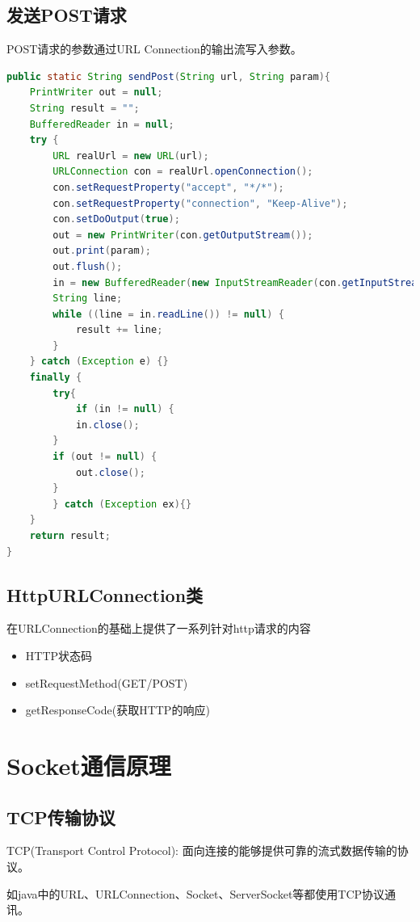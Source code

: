 \subsection{发送POST请求}
POST请求的参数通过URL Connection的输出流写入参数。
\begin{lstlisting}[language=java]
public static String sendPost(String url, String param){
	PrintWriter out = null;
	String result = "";
	BufferedReader in = null;
	try {
		URL realUrl = new URL(url);
		URLConnection con = realUrl.openConnection();
		con.setRequestProperty("accept", "*/*");
		con.setRequestProperty("connection", "Keep-Alive");
		con.setDoOutput(true);
		out = new PrintWriter(con.getOutputStream());
		out.print(param);
		out.flush();
		in = new BufferedReader(new InputStreamReader(con.getInputStream()));
		String line;
		while ((line = in.readLine()) != null) {
			result += line;
		}
	} catch (Exception e) {}
	finally {
		try{
			if (in != null) {
			in.close();
		}
		if (out != null) {
			out.close();
		}
		} catch (Exception ex){}
	}
	return result;
}
\end{lstlisting}
\subsection{HttpURLConnection类}
在URLConnection的基础上提供了一系列针对http请求的内容
\begin{itemize}
	\item HTTP状态码
	\item setRequestMethod(GET/POST)
	\item getResponseCode(获取HTTP的响应)
\end{itemize}
\section{Socket通信原理}
\subsection{TCP传输协议}
TCP(Transport Control Protocol): 面向连接的能够提供可靠的流式数据传输的协议。
\par 如java中的URL、URLConnection、Socket、ServerSocket等都使用TCP协议通讯。
